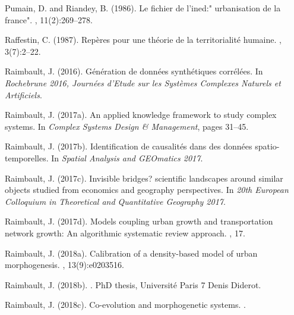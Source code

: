 \documentclass[11pt]{article}
\begin{document}
\begin{thebibliography}{}
Pumain, D. and Riandey, B. (1986).
\newblock Le fichier de l'ined:" urbanisation de la france".
, 11(2):269--278.

Raffestin, C. (1987).
\newblock Rep{\`e}res pour une th{\'e}orie de la territorialit{\'e} humaine.
, 3(7):2--22.

Raimbault, J. (2016).
\newblock G{\'e}n{\'e}ration de donn{\'e}es synth{\'e}tiques corr{\'e}l{\'e}es.
\newblock In {\em Rochebrune 2016, Journ{\'e}es d'Etude sur les Syst{\`e}mes
  Complexes Naturels et Artificiels}.

Raimbault, J. (2017a).
\newblock An applied knowledge framework to study complex systems.
\newblock In {\em Complex Systems Design \& Management}, pages 31--45.

Raimbault, J. (2017b).
\newblock Identification de causalit{\'e}s dans des donn{\'e}es
  spatio-temporelles.
\newblock In {\em Spatial Analysis and GEOmatics 2017}.

Raimbault, J. (2017c).
\newblock Invisible bridges? scientific landscapes around similar objects
  studied from economics and geography perspectives.
\newblock In {\em 20th European Colloquium in Theoretical and Quantitative
  Geography 2017}.

Raimbault, J. (2017d).
\newblock Models coupling urban growth and transportation network growth: An
  algorithmic systematic review approach.
, 17.

Raimbault, J. (2018a).
\newblock Calibration of a density-based model of urban morphogenesis.
, 13(9):e0203516.

Raimbault, J. (2018b).
.
\newblock PhD thesis, Universit{\'e} Paris 7 Denis Diderot.

Raimbault, J. (2018c).
\newblock Co-evolution and morphogenetic systems.
.


\end{thebibliography}
\end{document}
